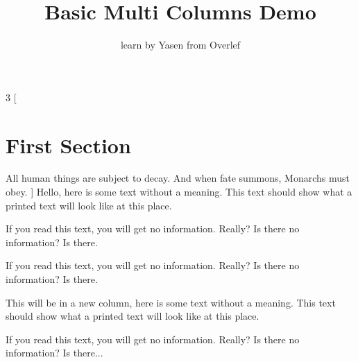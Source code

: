 \documentclass[]{article}
\title{Basic Multi Columns Demo}
\author{learn by Yasen from Overlef}
\begin{document}
	\maketitle
	
	\begin{multicols}{3}
		[
		\section{First Section}
		All human things are subject to decay. And when fate summons, Monarchs must obey.
		]
		Hello, here is some text without a meaning.  This text should show what 
		a printed text will look like at this place.
		
		If you read this text, you will get no information.  Really?  Is there 
		no information?  Is there.
		
		If you read this text, you will get no information.  Really?  Is there 
		no information?  Is there.
		
		\columnbreak
		
		\blindtext
		
		This will be in a new column, here is some text without a meaning.  This text 
		should show what a printed text will look like at this place.
		
		
		If you read this text, you will get no information.  Really?  Is there 
		no information?  Is there...
		
	\end{multicols}
	
	\blindtext
	
\end{document}
